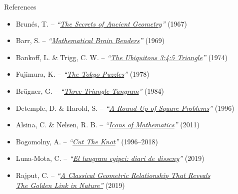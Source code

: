 \documentclass[14pt]{beamer}
\begin{document}
    \begin{frame}[t]{References}
        \begin{center}
            \bigskip
            {\footnotesize
            \begin{itemize}
            
                \item Brunés, T. -- \emph{``\href{https://books.google.es/books?id=L4pBPgAACAAJ}{The Secrets of Ancient Geometry}''} (1967)
                \item Barr, S. -- \emph{``\href{https://books.google.es/books?id=qTLbB08-kX0C}{Mathematical Brain Benders}''} (1969)
                \item Bankoff, L. \& Trigg, C. W. -- \emph{``\href{https://doi.org/10.2307/2688869}{The Ubiquitous 3:4:5 Triangle}''} (1974)
                \item Fujimura, K. -- \emph{``\href{https://books.google.es/books?id=Bo0pAQAAMAAJ}{The Tokyo Puzzles}''} (1978)
                \item Brügner, G. -- \emph{``\href{https://doi.org/10.1007/BF02136037}{Three-Triangle-Tangram}''} (1984)
                \item Detemple, D. \& Harold, S. -- \emph{``\href{https://doi.org/10.2307/2691390}{A Round-Up of Square Problems}''} (1996)
                \item Alsina, C. \& Nelsen, R. B. -- \emph{``\href{https://books.google.es/books?id=4DavMl7-aFgC}{Icons of Mathematics}''} (2011)
                \item Bogomolny, A. -- \emph{``\href{https://www.cut-the-knot.org/}{Cut The Knot}''} (1996--2018)
                \item Luna-Mota, C. -- \emph{``\href{https://publicacions.iec.cat/PopulaFitxa.do?idCatalogacio=33008}{El tangram egipci: diari de disseny}''}  (2019)
                \item Rajput, C. -- \emph{``\href{https://doi.org/10.24297/jam.v17i0.8498}{A Classical Geometric Relationship That Reveals}\\\qquad\qquad\qquad \href{https://doi.org/10.24297/jam.v17i0.8498}{The Golden Link in Nature''}} (2019)
            \end{itemize}}
            \bigskip\bigskip\bigskip\bigskip\bigskip
        \end{center}
    \end{frame}

\end{document}
